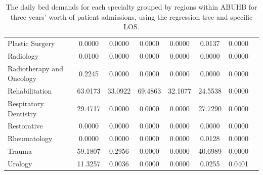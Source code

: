 \documentclass[thesis.tex]{subfiles}
\begin{document}
\begin{table}[h!]
{\begin{tabular}{lccccccc}
Plastic Surgery&0.0000&	0.0000&	0.0000&	0.0000&	0.0137&	0.0000\\
Radiology&0.0100&	0.0000&	0.0000&	0.0000&	0.0000&	0.0000\\
Radiotherapy and Oncology &0.2245&	0.0000&	0.0000&	0.0000&	0.0000&	0.0000\\
Rehabilitation&63.0173&	33.0922&	69.4863&	32.1077&	24.5538&	0.0000\\
Respiratory Dentistry&29.4717&	0.0000&	0.0000&	0.0000&	27.7290&	0.0000\\
Restorative&0.0000&	0.0000&	0.0000&	0.0000&	0.0000&	0.0000\\
Rheumatology&0.0000&	0.0000&	0.0000&	0.0000&	0.0128&	0.0000\\
Trauma&59.1807&	0.2956&	0.0000&	0.0000&	40.6989&	0.0000\\
Urology&11.3257&	0.0036&	0.0000&	0.0000&	0.0255&	0.0401\\

\bottomrule
    \end{tabular}}
    \caption{The daily bed demands for each specialty grouped by regions within ABUHB for three years’ worth of patient admissions, using the regression tree and specific LOS.}
    \label{apptab:LinkedDemands4}
\end{table}
\end{document}
